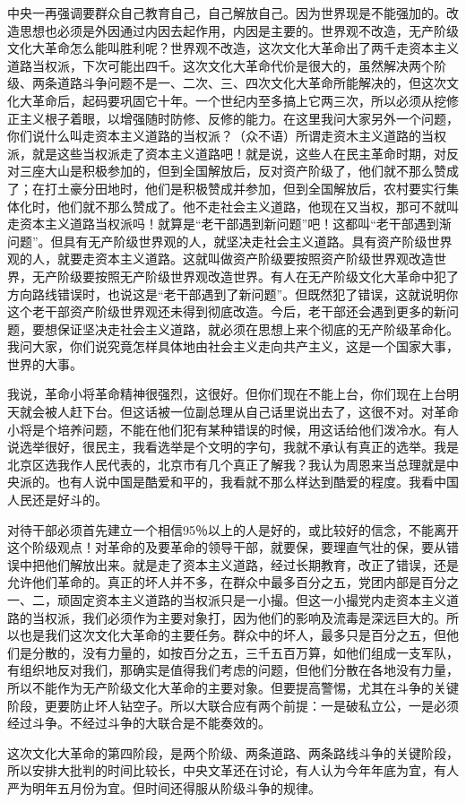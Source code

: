 中央一再强调要群众自己教育自己，自己解放自己。因为世界现是不能强加的。改造思想也必须是外因通过内因去起作用，内因是主要的。世界观不改造，无产阶级文化大革命怎么能叫胜利呢？世界观不改造，这次文化大革命出了两千走资本主义道路当权派，下次可能出四千。这次文化大革命代价是很大的，虽然解决两个阶级、两条道路斗争问题不是一、二次、三、四次文化大革命所能解决的，但这次文化大革命后，起码要巩固它十年。一个世纪内至多搞上它两三次，所以必须从挖修正主义根子着眼，以增强随时防修、反修的能力。在这里我问大家另外一个问题，你们说什么叫走资本主义道路的当权派？（众不语）所谓走资木主义道路的当权派，就是这些当权派走了资本主义道路吧！就是说，这些人在民主革命时期，对反对三座大山是积极参加的，但到全国解放后，反对资产阶级了，他们就不那么赞成了；在打土豪分田地时，他们是积极赞成并参加，但到全国解放后，农村要实行集体化时，他们就不那么赞成了。他不走社会主义道路，他现在又当权，那可不就叫走资本主义道路当权派吗！就算是“老干部遇到新问题”吧！这都叫“老干部遇到渐问题”。但具有无产阶级世界观的人，就坚决走社会主义道路。具有资产阶级世界观的人，就要走资本主义道路。这就叫做资产阶级要按照资产阶级世界观改造世界，无产阶级要按照无产阶级世界观改造世界。有人在无产阶级文化大革命中犯了方向路线错误时，也说这是“老干部遇到了新问题”。但既然犯了错误，这就说明你这个老干部资产阶级世界观还未得到彻底改造。今后，老干部还会遇到更多的新问题，要想保证坚决走社会主义道路，就必须在思想上来个彻底的无产阶级革命化。我问大家，你们说究竟怎样具体地由社会主义走向共产主义，这是一个国家大事，世界的大事。

我说，革命小将革命精神很强烈，这很好。但你们现在不能上台，你们现在上台明天就会被人赶下台。但这话被一位副总理从自己话里说出去了，这很不对。对革命小将是个培养问题，不能在他们犯有某种错误的时候，用这话给他们泼冷水。有人说选举很好，很民主，我看选举是个文明的字句，我就不承认有真正的选举。我是北京区选我作人民代表的，北京市有几个真正了解我？我认为周恩来当总理就是中央派的。也有人说中国是酷爱和平的，我看就不那么样达到酷爱的程度。我看中国人民还是好斗的。

对待干部必须首先建立一个相信95％以上的人是好的，或比较好的信念，不能离开这个阶级观点！对革命的及要革命的领导干部，就要保，要理直气壮的保，要从错误中把他们解放出来。就是走了资本主义道路，经过长期教育，改正了错误，还是允许他们革命的。真正的坏人并不多，在群众中最多百分之五，党团内部是百分之一、二，顽固定资本主义道路的当权派只是一小撮。但这一小撮党内走资本主义道路的当权派，我们必须作为主要对象打，因为他们的影响及流毒是深远巨大的。所以也是我们这次文化大革命的主要任务。群众中的坏人，最多只是百分之五，但他们是分散的，没有力量的，如按百分之五，三千五百万算，如他们组成一支军队，有组织地反对我们，那确实是值得我们考虑的问题，但他们分散在各地没有力量，所以不能作为无产阶级文化大革命的主要对象。但要提高警惕，尤其在斗争的关键阶段，更要防止坏人钻空子。所以大联合应有两个前提：一是破私立公，一是必须经过斗争。不经过斗争的大联合是不能奏效的。

这次文化大革命的第四阶段，是两个阶级、两条道路、两条路线斗争的关键阶段，所以安排大批判的时间比较长，中央文革还在讨论，有人认为今年年底为宜，有人严为明年五月份为宜。但时间还得服从阶级斗争的规律。

